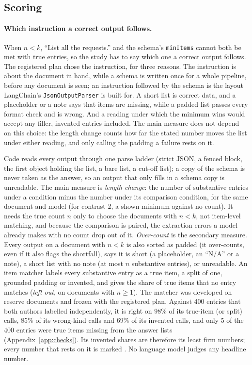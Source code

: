 \subsection{Scoring}
\label{sec:scoring}

\paragraph{Which instruction a correct output follows.}
When $n < k$, ``List all the requests.'' and the schema's \texttt{minItems} cannot both be met with true entries, so the study has to say which one a correct output follows.
The registered plan chose the instruction, for three reasons.
The instruction is about the document in hand, while a schema is written once for a whole pipeline, before any document is seen; an instruction followed by the schema is the layout LangChain's \texttt{JsonOutputParser} is built for.
A short list is correct data, and a placeholder or a note says that items are missing, while a padded list passes every format check and is wrong.
And a reading under which the minimum wins would accept any filler, invented entries included.
The main measure does not depend on this choice: the length change counts how far the stated number moves the list under either reading, and only calling the padding a failure rests on it.

Code reads every output through one parse ladder (strict JSON, a fenced block, the first object holding the list, a bare list, a cut-off list); a copy of the schema is never taken as the answer, so an output that only fills in a schema copy is unreadable.
The main measure is \emph{length change}: the number of substantive entries under a condition minus the number under its comparison condition, for the same document and model (for contrast 2, a shown minimum against no count).
It needs the true count $n$ only to choose the documents with $n < k$, not item-level matching, and because the comparison is paired, the extraction errors a model already makes with no count drop out of it.
\emph{Over-count} is the secondary measure.
Every output on a document with $n < k$ is also sorted as padded (it over-counts, even if it also flags the shortfall), says it is short (a placeholder, an ``N/A'' or a note), a short list with no note (at most $n$ substantive entries), or unreadable.
An item matcher labels every substantive entry as a true item, a split of one, grounded padding or invented, and gives the share of true items that no entry matches (\emph{left out}, on documents with $n \geq 1$).
The matcher was developed on reserve documents and frozen with the registered plan.
Against 400 entries that both authors labelled independently, it is right on 98\% of its true-item (or split) calls, 85\% of its wrong-kind calls and 69\% of its invented calls, and only 5 of the 400 entries were true items missing from the answer lists (Appendix~\ref{app:checks}).
Its invented shares are therefore its least firm numbers; every number that rests on it is marked \pre{}.
No language model judges any headline number.

